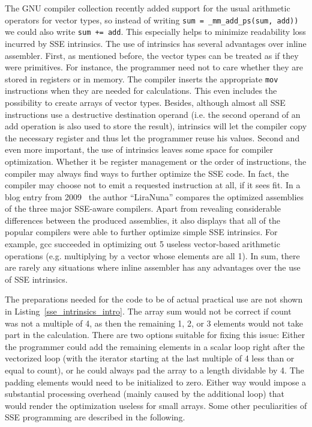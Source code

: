 The GNU compiler collection recently added support for the usual arithmetic operators for vector types, so instead of writing \texttt{sum = \_mm\_add\_ps(sum, add))} we could also write \texttt{sum += add}. This especially helps to minimize readability loss incurred by SSE intrinsics. The use of intrinsics has several advantages over inline assembler. First, as mentioned before, the vector types can be treated as if they were primitives. For instance, the programmer need not to care whether they are stored in registers or in memory. The compiler inserts the appropriate \texttt{mov} instructions when they are needed for calculations. This even includes the possibility to create arrays of vector types. Besides, although almost all SSE instructions use a destructive destination operand (i.e. the second operand of an add operation is also used to store the result), intrinsics will let the compiler copy the necessary register and thus let the programmer reuse his values. Second and even more important, the use of intrinsics leaves some space for compiler optimization. Whether it be register management or the order of instructions, the compiler may always find ways to further optimize the SSE code. In fact, the compiler may choose not to emit a requested instruction at all, if it sees fit. In a blog entry from 2009~\cite{liranuna2009} the author ``LiraNuna'' compares the optimized assemblies of the three major SSE-aware compilers. Apart from revealing considerable differences between the produced assemblies, it also displays that all of the popular compilers were able to further optimize simple SSE intrinsics. For example, gcc succeeded in optimizing out 5 useless vector-based arithmetic operations (e.g. multiplying by a vector whose elements are all 1). In sum, there are rarely any situations where inline assembler has any advantages over the use of SSE intrinsics.

The preparations needed for the code to be of actual practical use are not shown in Listing~\ref{sse_intrinsics_intro}. The array sum would not be correct if count was not a multiple of 4, as then the remaining 1, 2, or 3 elements would not take part in the calculation. There are two options suitable for fixing this issue: Either the programmer could add the remaining elements in a scalar loop right after the vectorized loop (with the iterator starting at the last multiple of 4 less than or equal to count), or he could always pad the array to a length dividable by 4. The padding elements would need to be initialized to zero. Either way would impose a substantial processing overhead (mainly caused by the additional loop) that would render the optimization useless for small arrays. Some other peculiarities of SSE programming are described in the following.

